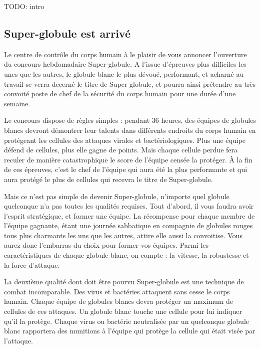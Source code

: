 \documentclass[a4paper,twoside,12pt]{article}
\begin{document}
TODO: intro

\subsection{Super-globule est arriv\'e}

Le  centre  de contr\^ole  du  corps humain  \`a  le  plaisir de  vous
annoncer l'ouverture du concours hebdomadaire Super-globule. A l'issue
d'\'epreuves plus difficiles les unes que les autres, le globule blanc
le  plus d\'evou\'e,  performant,  et acharn\'e  au  travail se  verra
decern\'e le  titre de Super-globule,  et pourra ainsi  pr\'etendre au
tr\`es convoit\'e  poste de  chef de la  s\'ecurit\'e du  corps humain
pour une dur\'ee d'une semaine.

Le  concours dispose  de r\`egles  simples  : pendant  36 heures,  des
\'equipes  de globules  blancs devront  d\'emontrer leur  talents dans
diff\'erents endroits du corps humain en prot\'egeant les cellules des
attaques virales et bact\'eriologiques.  Plus une \'equipe d\'efend de
cellules, plus elle  gagne de points. Mais chaque  cellule perdue fera
reculer de mani\`ere catastrophique le score de l'\'equipe cens\'ee la
prot\'eger. \`A la fin de  ces \'epreuves, c'est le chef de l'\'equipe
qui aura \'et\'e  la plus performante et qui  aura prot\'eg\'e le plus
de cellules qui recevra le titre de Super-globule.

Mais  ce n'est  pas simple  de devenir  Super-globule,  n'importe quel
globule  quelconque  n'a  pas  toutes les  qualit\'es  requises.  Tout
d'abord, il  vous faudra avoir  l'esprit strat\'egique, et  former une
\'equipe. La  r\'ecompense pour chaque membre  de l'\'equipe gagnante,
\'etant une journ\'ee sabbatique  en compagnie de globules rouges tous
plus  charmants  les  uns  que   les  autres,  attire  elle  aussi  la
convoitise.  Vous  aurez donc  l'embarras  du  choix  pour former  vos
\'equipes. Parmi  les caract\'eristiques  de chaque globule  blanc, on
compte : la vitesse, la robustesse et la force d'attaque.

La deuxi\`eme qualit\'e dont  doit \^etre pourvu Super-globule est une
technique de  combat incomparable. Des virus  et bact\'eries attaquent
sans cesse le  corps humain. Chaque \'equipe de  globules blancs devra
prot\'eger un  maximum de cellules  de ces attaques. Un  globule blanc
touche une cellule pour lui indiquer qu'il la prot\`ege.
Chaque  virus ou  bact\'erie neutralis\'ee  par un  quelconque globule
blanc rapportera des munitions \`a l'\'equipe qui prot\`ege la cellule
qui \'etait vis\'ee par l'attaque.
\end{document}
